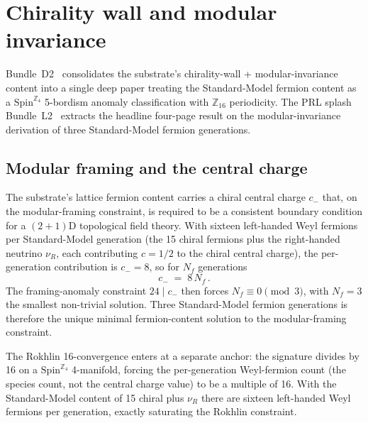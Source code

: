 \documentclass[aps,prd,reprint,nofootinbib,superscriptaddress]{revtex4-2}
\begin{document}

\section{Chirality wall and modular invariance}
\label{sec:chirality-wall-modular}

Bundle~D2~\cite{Roehm2026D2} consolidates the substrate's
chirality-wall + modular-invariance content into a single deep paper
treating the Standard-Model fermion content as a $\mathrm{Spin}^{\mathbb{Z}_4}$
5-bordism anomaly classification with $\mathbb{Z}_{16}$ periodicity.
The PRL splash Bundle~L2~\cite{Roehm2026Modular} extracts the
headline four-page result on the modular-invariance derivation of
three Standard-Model fermion generations.

\subsection{Modular framing and the central charge}

The substrate's lattice fermion content carries a chiral central
charge $c_-$ that, on the modular-framing constraint, is required to
be a consistent boundary condition for a $(2{+}1)$D topological field
theory. With sixteen left-handed Weyl fermions per Standard-Model
generation (the 15 chiral fermions plus the right-handed neutrino
$\nu_R$, each contributing $c = 1/2$ to the chiral central charge),
the per-generation contribution is $c_- = 8$, so for $N_f$ generations
\begin{equation}
  c_- \;=\; 8\,N_f\,.
\end{equation}
The framing-anomaly constraint $24 \mid c_-$ then forces $N_f \equiv
0 \pmod 3$, with $N_f = 3$ the smallest non-trivial solution. Three
Standard-Model fermion generations is therefore the unique minimal
fermion-content solution to the modular-framing constraint.

The Rokhlin 16-convergence enters at a separate anchor: the signature
divides by 16 on a $\mathrm{Spin}^{\mathbb{Z}_4}$ 4-manifold, forcing
the per-generation Weyl-fermion count (the species count, not the
central charge value) to be a multiple of 16. With the Standard-Model
content of 15 chiral plus $\nu_R$ there are sixteen left-handed Weyl
fermions per generation, exactly saturating the Rokhlin constraint.
\end{document}
